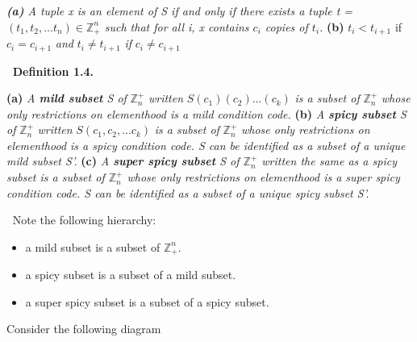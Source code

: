 \documentclass[12pt]{article}
\begin{document}
\begin{adjustwidth}{2.5em}{0pt}
	\textit{\textbf{(a)} A tuple x is an element of S if and only if there exists a tuple t = \((t_1,t_2,...t_n) \in \mathbb{Z}_+^n\) such that for all i, x contains \(c_i\) copies of \(t_i\).}
	\newline
	\newline
 \textbf{(b) } \(t_i < t_{i+1}\) if \(c_i = c_{i+1}\) \textit{ and } \(t_i \neq t_{i+1}\) \textit{ if } \(c_i \neq c_{i+1}\)
\end{adjustwidth}
\(\ \)
\newline
\textbf{Definition 1.4.}
\begin{adjustwidth}{2.5em}{0pt}
	\textbf{(a)}\textit{ A \textbf{mild subset} S of }\(\mathbb{Z}_n^+\)\textit{ written }\(S(c_1)(c_2)...(c_k)\) \textit{ is a subset of }\(\mathbb{Z}_n^+\) \textit{ whose only restrictions on elementhood is a mild condition code.}
	\newline
	\textbf{(b)}\textit{ A \textbf{spicy subset} S of }\(\mathbb{Z}_n^+\)\textit{ written }\(S(c_1,c_2,...c_k)\) \textit{ is a subset of }\(\mathbb{Z}_n^+\) \textit{ whose only restrictions on elementhood is a spicy condition code. S can be identified as a subset of a unique mild subset S'.}
	\newline
	\textbf{(c)}\textit{ A \textbf{super spicy subset} S of \(\mathbb{Z}_n^+\)\textit{ written the same as a spicy subset is a subset of }\(\mathbb{Z}_n^+\) \textit{ whose only restrictions on elementhood is a super spicy condition code. S can be identified as a subset of a unique spicy subset S'.}}
\end{adjustwidth}
\(\ \)
\newline
Note the following hierarchy:
\begin{itemize}
	\item a mild subset is a subset of \(\mathbb{Z}_+^n\).
	\item a spicy subset is a subset of a mild subset.
	\item a super spicy subset is a subset of a spicy subset.
\end{itemize}
Consider the following diagram
\end{document}
